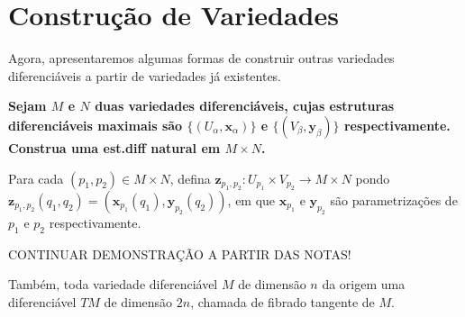 \section{Construção de Variedades}
\label{loc:construção_de_variedades}
Agora, apresentaremos algumas formas de construir outras variedades diferenciáveis a partir de variedades já existentes.
\begin{definition}
    \label{loc:exercício_1_:_variedade_produto}

    \textbf{Sejam $M$ e $N$ duas variedades diferenciáveis, cujas estruturas diferenciáveis maximais são $\{ (U_{\alpha}, \mathbf{x}_{\alpha}) \}$ e $\{ (V_{\beta},\mathbf{y}_{\beta}) \}$ respectivamente. Construa uma est.diff natural em $M\times N$.}

    Para cada $(p_1, p_2) \in M\times N$, defina $\mathbf{z}_{p_1,p_2}:U_{p_1} \times V_{p_2}\to M\times N$ pondo $\mathbf{z}_{p_1,p_2}(q_{1}, q_{2})=(\mathbf{x}_{p_{1}}(q_{1}), \mathbf{y}_{p_{2}}(q_{2}))$, em que $\mathbf{x}_{p_{1}}$ e $\mathbf{y}_{p_{2}}$ são parametrizações de $p_{1}$ e $p_{2}$ respectivamente.

    CONTINUAR DEMONSTRAÇÃO A PARTIR DAS NOTAS!
\end{definition}
Também, toda variedade diferenciável $M$ de dimensão $n$ da origem uma diferenciável $TM$ de dimensão $2n$, chamada de fibrado tangente de $M$.

